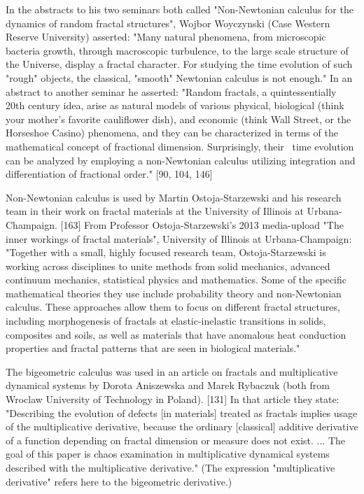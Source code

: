 \documentclass[12pt]{article}
\begin{document}
In the abstracts to his two seminars both called "Non-Newtonian calculus for the dynamics of random fractal structures", Wojbor Woyczynski (Case Western Reserve University) asserted: "Many natural phenomena, from microscopic bacteria growth, through macroscopic turbulence, to the large scale structure of the Universe, display a fractal character. For studying the time evolution of such "rough" objects, the classical, "smooth" Newtonian calculus is not enough." In an abstract to another seminar he asserted: "Random fractals, a quintessentially 20th century idea, arise as natural models of various physical, biological (think your mother's favorite cauliflower dish), and economic (think Wall Street, or the Horseshoe Casino) phenomena, and they can be characterized in terms of the mathematical concept of fractional dimension. Surprisingly, their  time evolution can be analyzed by employing a non-Newtonian calculus utilizing integration and differentiation of fractional order." [90, 104, 146]

Non-Newtonian calculus is used by Martin Ostoja-Starzewski and his research team in their work on fractal materials at the University of Illinois at Urbana-Champaign. [163] From Professor Ostoja-Starzewski's 2013 media-upload "The inner workings of fractal materials", University of Illinois at Urbana-Champaign: "Together with a small, highly focused research team, Ostoja-Starzewski is working across disciplines to unite methods from solid mechanics, advanced continuum mechanics, statistical physics and mathematics. Some of the specific mathematical theories they use include probability theory and non-Newtonian calculus. These approaches allow them to focus on different fractal structures, including morphogenesis of fractals at elastic-inelastic transitions in solids, composites and soils, as well as materials that have anomalous heat conduction properties and fractal patterns that are seen in biological materials."

The bigeometric calculus was used in an article on fractals and multiplicative dynamical systems by Dorota Aniszewska and Marek Rybaczuk (both from Wroclaw University of Technology in Poland). [131] In that article they state: "Describing the evolution of defects [in materials] treated as fractals implies usage of the multiplicative derivative, because the ordinary [classical] additive derivative of a function depending on fractal dimension or measure does not exist. ... The goal of this paper is chaos examination in multiplicative dynamical systems described with the multiplicative derivative." (The expression "multiplicative derivative" refers here to the bigeometric derivative.)
\end{document}
